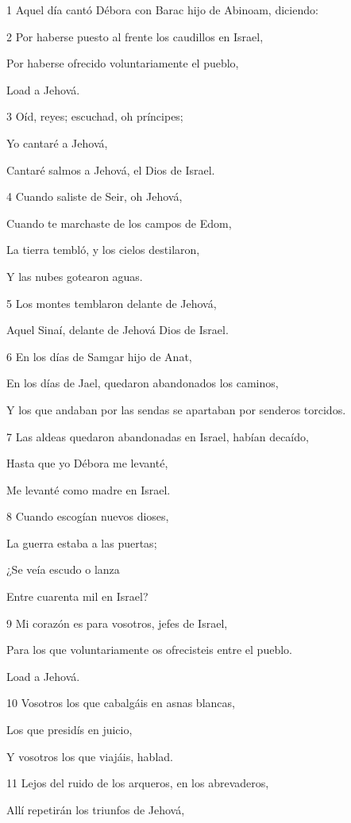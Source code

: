 \par 1 Aquel día cantó Débora con Barac hijo de Abinoam, diciendo:
\par 2 Por haberse puesto al frente los caudillos en Israel,
\par Por haberse ofrecido voluntariamente el pueblo,
\par Load a Jehová.
\par 3 Oíd, reyes; escuchad, oh príncipes;
\par Yo cantaré a Jehová,
\par Cantaré salmos a Jehová, el Dios de Israel.
\par 4 Cuando saliste de Seir, oh Jehová,
\par Cuando te marchaste de los campos de Edom,
\par La tierra tembló, y los cielos destilaron,
\par Y las nubes gotearon aguas. 
\par 5 Los montes temblaron delante de Jehová,
\par Aquel Sinaí, delante de Jehová Dios de Israel. 
\par 6 En los días de Samgar hijo de Anat,
\par En los días de Jael, quedaron abandonados los caminos,
\par Y los que andaban por las sendas se apartaban por senderos torcidos.
\par 7 Las aldeas quedaron abandonadas en Israel, habían decaído,
\par Hasta que yo Débora me levanté,
\par Me levanté como madre en Israel. 
\par 8 Cuando escogían nuevos dioses,
\par La guerra estaba a las puertas;
\par ¿Se veía escudo o lanza
\par Entre cuarenta mil en Israel? 
\par 9 Mi corazón es para vosotros, jefes de Israel,
\par Para los que voluntariamente os ofrecisteis entre el pueblo.
\par Load a Jehová.
\par 10 Vosotros los que cabalgáis en asnas blancas,
\par Los que presidís en juicio,
\par Y vosotros los que viajáis, hablad.
\par 11 Lejos del ruido de los arqueros, en los abrevaderos,
\par Allí repetirán los triunfos de Jehová,
